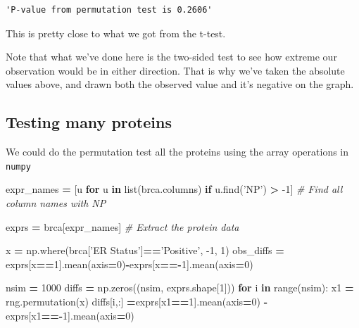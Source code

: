 \documentclass[
  letterpaper,
]{scrbook}
\newenvironment{Shaded}{\begin{snugshade}}{\end{snugshade}}
\newcommand{\BuiltInTok}[1]{#1}
\newcommand{\CommentTok}[1]{\textcolor[rgb]{0.56,0.35,0.01}{\textit{#1}}}
\newcommand{\ControlFlowTok}[1]{\textcolor[rgb]{0.13,0.29,0.53}{\textbf{#1}}}
\newcommand{\DecValTok}[1]{\textcolor[rgb]{0.00,0.00,0.81}{#1}}
\newcommand{\KeywordTok}[1]{\textcolor[rgb]{0.13,0.29,0.53}{\textbf{#1}}}
\newcommand{\NormalTok}[1]{#1}
\newcommand{\OperatorTok}[1]{\textcolor[rgb]{0.81,0.36,0.00}{\textbf{#1}}}
\newcommand{\StringTok}[1]{\textcolor[rgb]{0.31,0.60,0.02}{#1}}
\begin{document}
\begin{verbatim}
'P-value from permutation test is 0.2606'
\end{verbatim}

This is pretty close to what we got from the t-test.

Note that what we've done here is the two-sided test to see how extreme our observation would be in either direction. That is why we've taken the absolute values above, and drawn both the
observed value and it's negative on the graph.

\hypertarget{testing-many-proteins}{%
\subsection{Testing many proteins}\label{testing-many-proteins}}

We could do the permutation test all the proteins using the array operations in \texttt{numpy}

\begin{Shaded}
\begin{Highlighting}[]
\NormalTok{expr_names }\OperatorTok{=}\NormalTok{ [u }\ControlFlowTok{for}\NormalTok{ u }\KeywordTok{in} \BuiltInTok{list}\NormalTok{(brca.columns) }\ControlFlowTok{if}\NormalTok{ u.find(}\StringTok{'NP'}\NormalTok{) }\OperatorTok{>} \DecValTok{-1}\NormalTok{] }
            \CommentTok{# Find all column names with NP}

\NormalTok{exprs }\OperatorTok{=}\NormalTok{ brca[expr_names] }\CommentTok{# Extract the protein data}
\end{Highlighting}
\end{Shaded}

\begin{Shaded}
\begin{Highlighting}[]
\NormalTok{x }\OperatorTok{=}\NormalTok{ np.where(brca[}\StringTok{'ER Status'}\NormalTok{]}\OperatorTok{==}\StringTok{'Positive'}\NormalTok{, }\DecValTok{-1}\NormalTok{, }\DecValTok{1}\NormalTok{)}
\NormalTok{obs_diffs }\OperatorTok{=}\NormalTok{ exprs[x}\OperatorTok{==}\DecValTok{1}\NormalTok{].mean(axis}\OperatorTok{=}\DecValTok{0}\NormalTok{)}\OperatorTok{-}\NormalTok{exprs[x}\OperatorTok{==-}\DecValTok{1}\NormalTok{].mean(axis}\OperatorTok{=}\DecValTok{0}\NormalTok{)}
\end{Highlighting}
\end{Shaded}

\begin{Shaded}
\begin{Highlighting}[]
\NormalTok{nsim }\OperatorTok{=} \DecValTok{1000}
\NormalTok{diffs }\OperatorTok{=}\NormalTok{ np.zeros((nsim, exprs.shape[}\DecValTok{1}\NormalTok{]))}
\ControlFlowTok{for}\NormalTok{ i }\KeywordTok{in} \BuiltInTok{range}\NormalTok{(nsim):}
\NormalTok{    x1 }\OperatorTok{=}\NormalTok{ rng.permutation(x)}
\NormalTok{    diffs[i,:] }\OperatorTok{=}\NormalTok{exprs[x1}\OperatorTok{==}\DecValTok{1}\NormalTok{].mean(axis}\OperatorTok{=}\DecValTok{0}\NormalTok{) }\OperatorTok{-}\NormalTok{ exprs[x1}\OperatorTok{==-}\DecValTok{1}\NormalTok{].mean(axis}\OperatorTok{=}\DecValTok{0}\NormalTok{)}
\end{Highlighting}
\end{Shaded}
\end{document}
